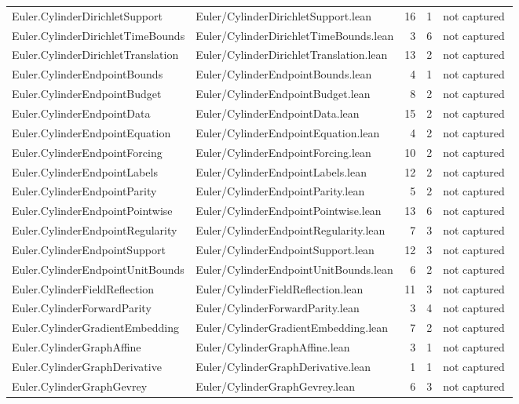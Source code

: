 \documentclass[10pt]{article}
\begin{document}
\begin{longtable}{p{0.28\linewidth}p{0.27\linewidth}r r p{0.20\linewidth}}
Euler.CylinderDirichletSupport & Euler/CylinderDirichletSupport.lean & 16 & 1 & not captured\\
Euler.CylinderDirichletTimeBounds & Euler/CylinderDirichletTimeBounds.lean & 3 & 6 & not captured\\
Euler.CylinderDirichletTranslation & Euler/CylinderDirichletTranslation.lean & 13 & 2 & not captured\\
Euler.CylinderEndpointBounds & Euler/CylinderEndpointBounds.lean & 4 & 1 & not captured\\
Euler.CylinderEndpointBudget & Euler/CylinderEndpointBudget.lean & 8 & 2 & not captured\\
Euler.CylinderEndpointData & Euler/CylinderEndpointData.lean & 15 & 2 & not captured\\
Euler.CylinderEndpointEquation & Euler/CylinderEndpointEquation.lean & 4 & 2 & not captured\\
Euler.CylinderEndpointForcing & Euler/CylinderEndpointForcing.lean & 10 & 2 & not captured\\
Euler.CylinderEndpointLabels & Euler/CylinderEndpointLabels.lean & 12 & 2 & not captured\\
Euler.CylinderEndpointParity & Euler/CylinderEndpointParity.lean & 5 & 2 & not captured\\
Euler.CylinderEndpointPointwise & Euler/CylinderEndpointPointwise.lean & 13 & 6 & not captured\\
Euler.CylinderEndpointRegularity & Euler/CylinderEndpointRegularity.lean & 7 & 3 & not captured\\
Euler.CylinderEndpointSupport & Euler/CylinderEndpointSupport.lean & 12 & 3 & not captured\\
Euler.CylinderEndpointUnitBounds & Euler/CylinderEndpointUnitBounds.lean & 6 & 2 & not captured\\
Euler.CylinderFieldReflection & Euler/CylinderFieldReflection.lean & 11 & 3 & not captured\\
Euler.CylinderForwardParity & Euler/CylinderForwardParity.lean & 3 & 4 & not captured\\
Euler.CylinderGradientEmbedding & Euler/CylinderGradientEmbedding.lean & 7 & 2 & not captured\\
Euler.CylinderGraphAffine & Euler/CylinderGraphAffine.lean & 3 & 1 & not captured\\
Euler.CylinderGraphDerivative & Euler/CylinderGraphDerivative.lean & 1 & 1 & not captured\\
Euler.CylinderGraphGevrey & Euler/CylinderGraphGevrey.lean & 6 & 3 & not captured\\

\end{longtable}
\end{document}
